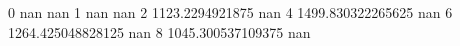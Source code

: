 0 nan nan
1 nan nan
2 1123.2294921875 nan
4 1499.830322265625 nan
6 1264.425048828125 nan
8 1045.300537109375 nan
